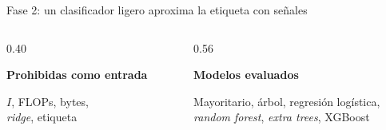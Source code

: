 \begin{frame}{Fase 2: un clasificador ligero aproxima la etiqueta con señales}
  \vspace{-1.5mm}
  \begin{columns}[T]
    \begin{column}{0.40\textwidth}
      \begin{card}[fontupper=\small,top=1.5mm,bottom=1.5mm]
        \textbf{Prohibidas como entrada}\par\vspace{0.5mm}
        $I$, FLOPs, bytes,\\\textit{ridge}, etiqueta
      \end{card}
    \end{column}
    \begin{column}{0.56\textwidth}
      \begin{card}[fontupper=\small,top=1.5mm,bottom=1.5mm]
        \textbf{Modelos evaluados}\par\vspace{0.5mm}
        Mayoritario, árbol, regresión logística,\\\textit{random forest}, \textit{extra trees}, XGBoost
      \end{card}
    \end{column}
  \end{columns}
\end{frame}

